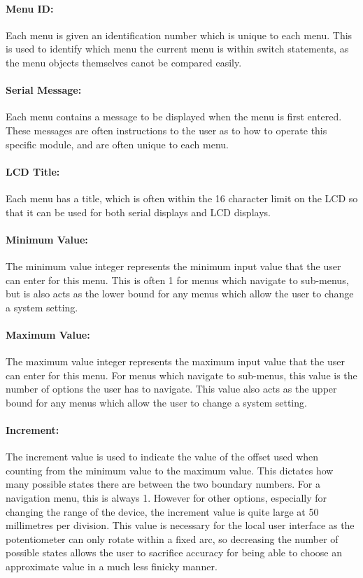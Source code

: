 \documentclass[]{report}
\begin{document}
\paragraph{Menu ID:}
Each menu is given an identification number which is unique to each menu. This is used to identify which menu the current menu is within switch statements, as the menu objects themselves canot be compared easily. 

\paragraph{Serial Message:}
Each menu contains a message to be displayed when the menu is first entered. These messages are often instructions to the user as to how to operate this specific module, and are often unique to each menu.

\paragraph{LCD Title:}
Each menu has a title, which is often within the 16 character limit on the LCD so that it can be used for both serial displays and LCD displays. 

\paragraph{Minimum Value:}
The minimum value integer represents the minimum input value that the user can enter for this menu. This is often 1 for menus which navigate to sub-menus, but is also acts as the lower bound for any menus which allow the user to change a system setting. 

\paragraph{Maximum Value:}
The maximum value integer represents the maximum input value that the user can enter for this menu. For menus which navigate to sub-menus, this value is the number of options the user has to navigate. This value also acts as the upper bound for any menus which allow the user to change a system setting. 

\paragraph{Increment:}
The increment value is used to indicate the value of the offset used when counting from the minimum value to the maximum value. This dictates how many possible states there are between the two boundary numbers. For a navigation menu, this is always 1. However for other options, especially for changing the range of the device, the increment value is quite large at 50 millimetres per division. This value is necessary for the local user interface as the potentiometer can only rotate within a fixed arc, so decreasing the number of possible states allows the user to sacrifice accuracy for being able to choose an approximate value in a much less finicky manner.
\end{document}
